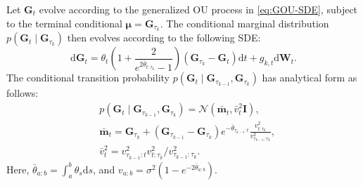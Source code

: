Let $\bm{G}_t$ evolve according to the generalized OU process in \cref{eq:GOU-SDE}, subject to the terminal conditional $\bm{\mu}=\bm{G}_{\tau_k}$. 
The conditional marginal distribution $p(\bm{G}_t\mid\bm{G}_{\tau_k})$ then evolves according to the following SDE:
\begin{equation}
\mathrm{d}\bm{G}_t = \theta_t \left( 1 + \frac{2}{e^{2\bar{\theta}_{t:\tau_k}}-1}  \right)(\bm{G}_{\tau_k} - \bm{G}_t)  \mathrm{d}t 
+ g_{k,t} \mathrm{d}\bm{W}_t.\nonumber
\end{equation}
The conditional transition probability $p(\bm{G}_t \mid \bm{G}_{\tau_{k-1}}, \bm{G}_{\tau_k})$ has analytical form as follows:
\begin{equation}
\begin{split}
&p(\bm{G}_t \mid  \bm{G}_{\tau_{k-1}}, \bm{G}_{\tau_k}) 
= \mathcal{N}(\bar{\mathbf{m}}_t, \bar{v}_t^2 \bm{I}),\\
&\bar{\mathbf{m}}_t = 
\bm{G}_{\tau_k} + (\bm{G}_{\tau_{k-1}}-\bm{G}_{\tau_k})e^{-\bar{\theta}_{\tau_{k-1}:t}} 
\frac{v_{t:\tau_k}^2}{v_{\tau_{k-1}:\tau_k}^2}, \\
&\bar{v}_t^2 = {v_{\tau_{k-1}:t}^2 v_{t:\tau_k}^2}/{v_{\tau_{k-1}:\tau_k}^2}.
\end{split}
\end{equation}
Here, $\bar{\theta}_{a:b}=\int_a^b \theta_s  \mathrm{d}s$, and $v_{a:b}=\sigma^2(1-e^{-2\bar{\theta}_{a:b}})$.
